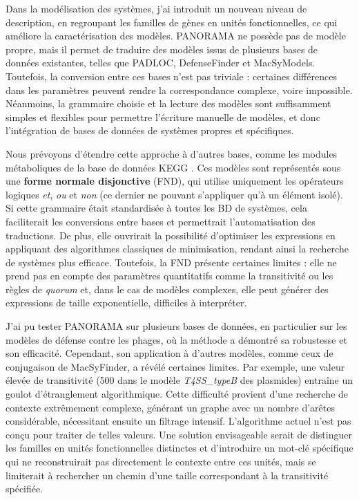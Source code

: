 Dans la modélisation des systèmes, j'ai introduit un nouveau niveau de description, en regroupant les familles de gènes en unités fonctionnelles, ce qui améliore la caractérisation des modèles. PANORAMA ne possède pas de modèle propre, mais il permet de traduire des modèles issus de plusieurs bases de données existantes, telles que PADLOC, DefenseFinder et MacSyModels. Toutefois, la conversion entre ces bases n’est pas triviale : certaines différences dans les paramètres peuvent rendre la correspondance complexe, voire impossible. Néanmoins, la grammaire choisie et la lecture des modèles sont suffisamment simples et flexibles pour permettre l'écriture manuelle de modèles, et donc l'intégration de bases de données de systèmes propres et spécifiques. 

Nous prévoyons d’étendre cette approche à d’autres bases, comme les modules métaboliques de la base de données KEGG \cite{kanehisa_kegg_2025}. Ces modèles sont représentés sous une \textbf{forme normale disjonctive} (FND), qui utilise uniquement les opérateurs logiques \textit{et}, \textit{ou} et \textit{non} (ce dernier ne pouvant s’appliquer qu’à un élément isolé). Si cette grammaire était standardisée à toutes les BD de systèmes, cela faciliterait les conversions entre bases et permettrait l’automatisation des traductions. De plus, elle ouvrirait la possibilité d’optimiser les expressions en appliquant des algorithmes classiques de minimisation, rendant ainsi la recherche de systèmes plus efficace. Toutefois, la FND présente certaines limites : elle ne prend pas en compte des paramètres quantitatifs comme la transitivité ou les règles de \textit{quorum} et, dans le cas de modèles complexes, elle peut générer des expressions de taille exponentielle, difficiles à interpréter.

\newpage

J'ai pu tester PANORAMA sur plusieurs bases de données, en particulier sur les modèles de défense contre les phages, où la méthode a démontré sa robustesse et son efficacité. Cependant, son application à d’autres modèles, comme ceux de conjugaison de MacSyFinder, a révélé certaines limites. Par exemple, une valeur élevée de transitivité (500 dans le modèle \textit{T4SS\_typeB} des plasmides) entraîne un goulot d’étranglement algorithmique. Cette difficulté provient d’une recherche de contexte extrêmement complexe, générant un graphe avec un nombre d’arêtes considérable, nécessitant ensuite un filtrage intensif. L’algorithme actuel n’est pas conçu pour traiter de telles valeurs. Une solution envisageable serait de distinguer les familles en unités fonctionnelles distinctes et d’introduire un mot-clé spécifique qui ne reconstruirait pas directement le contexte entre ces unités, mais se limiterait à rechercher un chemin d’une taille correspondant à la transitivité spécifiée.


